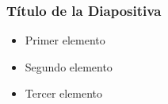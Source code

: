 \documentclass{beamer}
\begin{document}
\begin{frame}
    \frametitle{Título de la Diapositiva}
    \begin{itemize}
        \item<1-> Primer elemento
        \item<2-> Segundo elemento
        \item<3-> Tercer elemento
    \end{itemize}
\end{frame}
\end{document}
